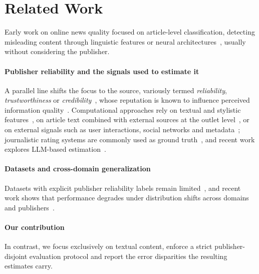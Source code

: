 \documentclass[runningheads]{llncs}
\begin{document}
\section{Related Work}
Early work on online news quality focused on article-level classification, detecting misleading content through linguistic features or neural architectures~\cite{pandolfi2020automatic}, usually without considering the publisher.

\paragraph{Publisher reliability and the signals used to estimate it} A parallel line shifts the focus to the source, variously termed \emph{reliability}, \emph{trustworthiness} or \emph{credibility}~\cite{digitalmedia2007,infodisorder2017,10.1145/302979.303001}, whose reputation is known to influence perceived information quality~\cite{doi:10.1080/07421222.2019.1628921}. Computational approaches rely on textual and stylistic features~\cite{Przybyla2021plugin}, on article text combined with external sources at the outlet level~\cite{baly-etal-2018-predicting}, or on external signals such as user interactions, social networks and metadata~\cite{bazmi2023multi,DBLP:conf/ecir/PratelliSP25,DBLP:conf/icwsm/WilliamsCC25,DBLP:journals/jdiq/LongoZCZC25}; journalistic rating systems are commonly used as ground truth~\cite{lin2023high,DBLP:conf/icwsm/PratelliP22}, and recent work explores LLM-based estimation~\cite{10.1145/3770077,nakov2024survey,yang2023large,Leite2025}.

\paragraph{Datasets and cross-domain generalization} Datasets with explicit publisher reliability labels remain limited~\cite{bohavcek2022fine,DBLP:journals/dbsk/AdjiLS26,batDataset}, and recent work shows that performance degrades under distribution shifts across domains and publishers~\cite{azizov-etal-2024-safari,burdisso-etal-2024-reliability,verhoeven2025yesterday}.

\paragraph{Our contribution} In contrast, we focus exclusively on textual content, enforce a strict publisher-disjoint evaluation protocol and report the error disparities the resulting estimates carry.
\end{document}
